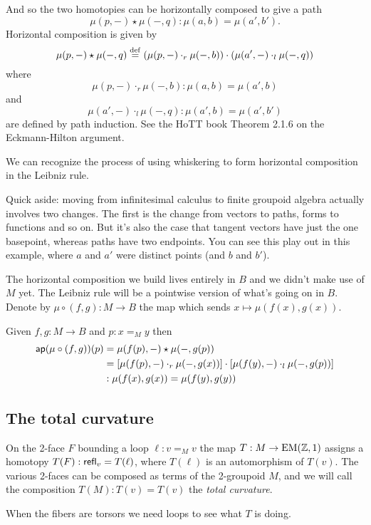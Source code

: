 And so the two homotopies can be horizontally composed to give a path \[ \mu(p,-)\star\mu(-,q): \mu(a, b)=\mu(a',b'). \] Horizontal composition is given by \[\mu(p,-)\star\mu(-,q)\stackrel{\mathrm{def}}{=}(\mu(p,-)\cdot_r \mu(-,b))\cdot(\mu(a', -)\cdot_l\mu(-, q))\] where \[ \mu(p,-)\cdot_r\mu(-,b):\mu(a,b)=\mu(a',b) \] and \[ \mu(a',-)\cdot_l\mu(-,q):\mu(a',b)=\mu(a',b') \] are defined by path induction.  See the HoTT book Theorem 2.1.6 on the Eckmann-Hilton argument\cite{hottbook}.

We can recognize the process of using whiskering to form horizontal composition in the Leibniz rule. 

Quick aside: moving from infinitesimal calculus to finite groupoid algebra actually involves two changes. The first is the change from vectors to paths, forms to functions and so on. But it's also the case that tangent vectors have just the one basepoint, whereas paths have two endpoints. You can see this play out in this example, where \( a \) and \( a' \) were distinct points (and \( b \) and \( b' \)).

The horizontal composition we build lives entirely in \( B \) and we didn't make use of \( M \) yet. The Leibniz rule will be a pointwise version of what's going on in \( B \). Denote by \( \mu\circ(f,g):M\to B \) the map which sends \( x\mapsto \mu(f(x),g(x)) \).

\begin{mylemma}
Given \( f, g:M\to B \) and \( p:x=_M y \) then 
\begin{align*}
 \mathsf{ap}(\mu\circ(f,g))(p)&=\mu(f(p),-)\star\mu(-,g(p))\\
 &=\left[\mu(f(p),-)\cdot_r \mu(-,g(x))\right]\cdot \left[\mu(f(y),-)\cdot_l\mu(-,g(p))\right]\\
 &:\mu(f(x),g(x))=\mu(f(y),g(y))
\end{align*}
\end{mylemma}

\subsection{The total curvature}

On the 2-face \( F \) bounding a loop \( \ell:v=_M v \) the map \( T:M\to\mathrm{EM}(\mathbb{Z},1) \) assigns a homotopy \( T(F):\mathsf{refl}_v=T(\ell) \), where \( T(\ell) \) is an automorphism of \( T(v) \). The various 2-faces can be composed as terms of the 2-groupoid \( M \), and we will call the composition \( T(M):T(v)=T(v) \) the \emph{total curvature}.

When the fibers are torsors we need loops to see what \( T \) is doing.

